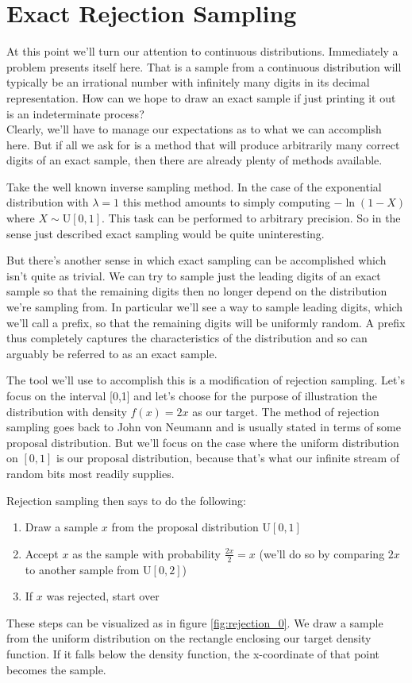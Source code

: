 \section{Exact Rejection Sampling}

At this point we'll turn our attention to continuous distributions. Immediately a problem presents itself here. That is a sample from a continuous distribution will typically be an irrational number with infinitely many digits in its decimal representation. How can we hope to draw an exact sample if just printing it out is an indeterminate process?\\
Clearly, we'll have to manage our expectations as to what we can accomplish here. But if all we ask for is a method that will produce arbitrarily many correct digits of an exact sample, then there are already plenty of methods available.

Take the well known inverse sampling method. In the case of the exponential distribution with $\lambda = 1$ this method amounts to simply computing $-\ln(1-X)$ where $X \sim \text{U}[0,1]$. This task can be performed to arbitrary precision. So in the sense just described exact sampling would be quite uninteresting.

But there's another sense in which exact sampling can be accomplished which isn't quite as trivial. We can try to sample just the leading digits of an exact sample so that the remaining digits then no longer depend on the distribution we're sampling from. In particular we'll see a way to sample leading digits, which we'll call a prefix, so that the remaining digits will be uniformly random. A prefix thus completely captures the characteristics of the distribution and so can arguably be referred to as an exact sample.

The tool we'll use to accomplish this is a modification of rejection sampling. Let's focus on the interval [0,1] and let's choose for the purpose of illustration the distribution with density $f(x) = 2x$ as our target. The method of rejection sampling goes back to John von Neumann and is usually stated in terms of some proposal distribution. But we'll focus on the case where the uniform distribution on $[0,1]$ is our proposal distribution, because that's what our infinite stream of random bits most readily supplies.

Rejection sampling then says to do the following:
\begin{enumerate}
    \item Draw a sample $x$ from the proposal distribution U$[0,1]$
    \item Accept $x$ as the sample with probability $\frac{2x}{2} = x$ (we'll do so by comparing $2x$ to another sample from U$[0,2]$)
    \item If $x$ was rejected, start over
\end{enumerate}
These steps can be visualized as in figure \ref{fig:rejection_0}. We draw a sample from the uniform distribution on the rectangle enclosing our target density function. If it falls below the density function, the x-coordinate of that point becomes the sample.

